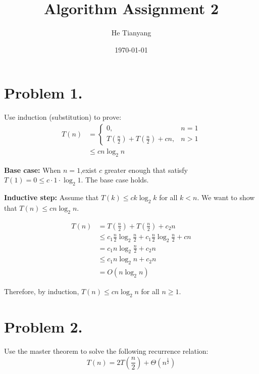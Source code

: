 \documentclass{article}
\title{Algorithm Assignment 2}
\author{He Tianyang}
\date{\today}
\begin{document}
\maketitle

\section{Problem 1.}
Use induction (substitution) to prove:
\begin{align}
    T(n) & = \begin{cases}
                 0,                                    & n = 1 \\
                 T(\frac{n}{2}) + T(\frac{n}{2}) + cn, & n > 1
             \end{cases} \\
         & \leq cn\log_2n
\end{align}

\textbf{Base case:} When $n = 1$,exist $c$ greater enough that satisfy $T(1) = 0 \leq c \cdot 1 \cdot \log_2 1$. The base case holds.

\textbf{Inductive step:} Assume that $T(k) \leq ck\log_2k$ for all $k < n$. We want to show that $T(n) \leq cn\log_2n$.

\begin{align*}
    T(n) & = T\left(\frac{n}{2}\right) + T\left(\frac{n}{2}\right) + c_2n              \\
         & \leq c_1\frac{n}{2}\log_2\frac{n}{2} + c_1\frac{n}{2}\log_2\frac{n}{2} + cn \\
         & = c_1n\log_2\frac{n}{2} + c_2n                                              \\
         & \leq c_1n\log_2n + c_2n                                                     \\
         & = O(n\log_2n)
\end{align*}

Therefore, by induction, $T(n) \leq cn\log_2n$ for all $n \geq 1$.

\section{Problem 2.}

Use the master theorem to solve the following recurrence relation:
\begin{equation}
    T(n) = 2T\left(\frac{n}{2}\right) + \Theta(n^{\frac{1}{2}})
\end{equation}
\end{document}
